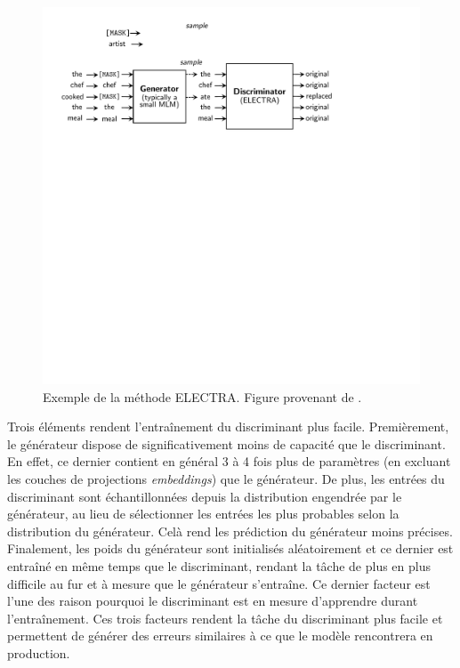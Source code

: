 \documentclass[12pt,twoside,maitrise]{dms}
\theoremstyle{definition}
\numberwithin{equation}{section}
\numberwithin{table}{chapter}
\numberwithin{figure}{chapter}
\begin{document}
\begin{figure}
	\begin{center}
		\includegraphics[width=1.0\textwidth]{figures/electra_entr.pdf}
	\end{center}
	\caption{Exemple de la méthode ELECTRA. Figure provenant de \cite{clark2020electrapretrainingtextencoders}.}
	\label{fig:electra}
\end{figure}


Trois éléments rendent l'entraînement du discriminant plus facile.
Premièrement, le générateur dispose de significativement moins de capacité que
le discriminant. En effet, ce dernier contient en général 3 à 4 fois plus de
paramètres (en excluant les couches de projections \textit{embeddings}) que le
générateur. De plus, les entrées du discriminant sont échantillonnées depuis la
distribution engendrée par le générateur, au lieu de sélectionner les entrées
les plus probables selon la distribution du générateur. Celà rend les
prédiction du générateur moins précises. Finalement, les poids du générateur
sont initialisés aléatoirement et ce dernier est entraîné en même temps que le
discriminant, rendant la tâche de plus en plus difficile au fur et à mesure que
le générateur s'entraîne. Ce dernier facteur est l'une des raison pourquoi le
discriminant est en mesure d'apprendre durant l'entraînement. Ces trois
facteurs rendent la tâche du discriminant plus facile et permettent de générer
des erreurs similaires à ce que le modèle rencontrera en production.\\
\end{document}

